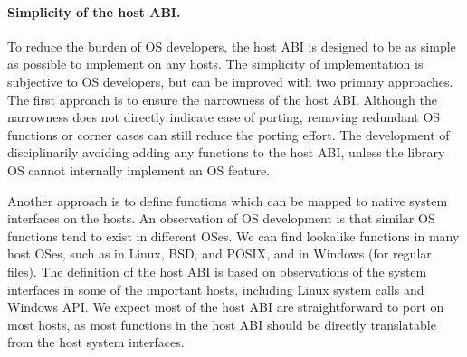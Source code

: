 \paragraph{Simplicity of the host ABI.}
To reduce the burden of OS developers, the host ABI is designed to be as simple as possible to implement on any hosts.
The simplicity of implementation is subjective to OS developers,
but can be improved with two primary approaches.
The first approach is to ensure the narrowness of the host ABI.
Although the narrowness does not directly indicate ease of porting, removing redundant OS functions or corner cases
can still reduce the porting effort.
The development of \graphene{} disciplinarily avoiding adding any functions to the host ABI,
unless the library OS cannot internally implement an OS feature.


Another approach is to define functions which can be mapped to native system interfaces on the hosts.
An observation of OS development is that
similar OS functions tend to exist in different OSes.
We can find lookalike functions in many host OSes, such as  in Linux, BSD, and POSIX, and  in Windows (for regular files).
The definition of the host ABI
is based on observations of the system interfaces in some of the important hosts,
including Linux system calls and Windows API.
We expect most of the host ABI are straightforward to port on most hosts,
as most functions in the host ABI should be directly translatable from the host system interfaces.







